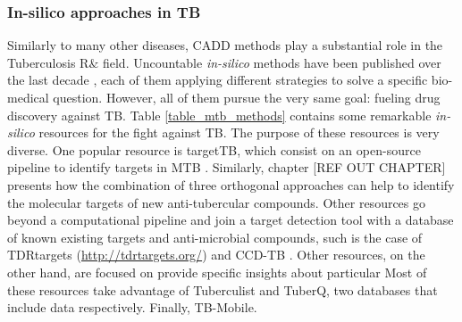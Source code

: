 \documentclass[12pt, a4paper,twoside]{tesi_upf}
\begin{document}
\subsubsection{In-silico approaches in TB}

\par Similarly to many other diseases, CADD methods play a substantial role in the Tuberculosis R$\&$ field. Uncountable \textit{in-silico} methods have been published over the last decade \cite{Ekins2013}, each of them applying different strategies to solve a specific bio-medical question. However, all of them pursue the very same goal: fueling drug discovery against TB. Table \ref{table_mtb_methods} contains some remarkable \textit{in-silico} resources for the fight
against TB. The purpose of these resources is very diverse. One popular resource is targetTB, which consist on an open-source pipeline to identify targets in MTB \cite{Raman2008}. Similarly, chapter [REF OUT CHAPTER] presents how the combination of three orthogonal approaches can help to identify the molecular targets of new anti-tubercular compounds. Other resources go beyond a computational pipeline and join a target detection tool with a database of known existing targets and anti-microbial compounds, such is the case of TDRtargets \cite{Crowther2010} (\url{http://tdrtargets.org/}) and CCD-TB \cite{Ekins2010} . Other resources, on the other hand,  are focused on provide specific insights about particular  Most of these resources take advantage of Tuberculist and TuberQ, two databases that include data respectively. Finally, TB-Mobile. 
\renewcommand{\arraystretch}{1.2} %
\end{document}
